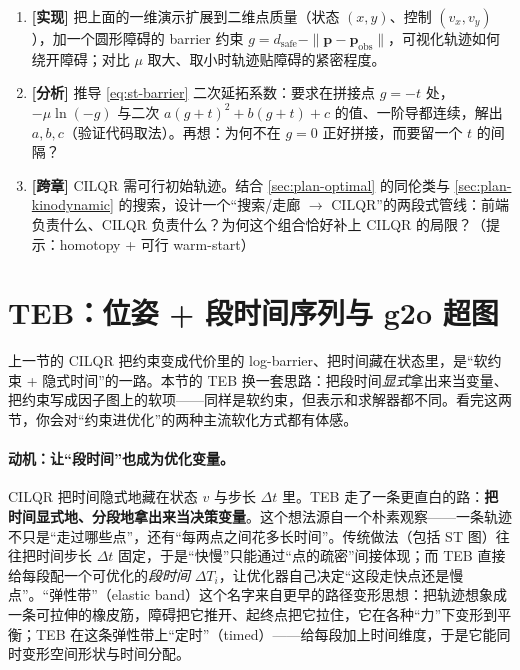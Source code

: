 \begin{practice}
\begin{enumerate}
  \item \textbf{[实现]} 把上面的一维演示扩展到二维点质量（状态 $(x,y)$、控制 $(v_x,v_y)$），加一个圆形障碍的 barrier 约束 $g=d_{\text{safe}}-\|\mathbf p-\mathbf p_{\text{obs}}\|$，可视化轨迹如何绕开障碍；对比 $\mu$ 取大、取小时轨迹贴障碍的紧密程度。
  \item \textbf{[分析]} 推导 \cref{eq:st-barrier} 二次延拓系数：要求在拼接点 $g=-t$ 处，$-\mu\ln(-g)$ 与二次 $a(g+t)^2+b(g+t)+c$ 的值、一阶导都连续，解出 $a,b,c$（验证代码取法）。再想：为何不在 $g=0$ 正好拼接，而要留一个 $t$ 的间隔？
  \item \textbf{[跨章]} CILQR 需可行初始轨迹。结合 \cref{sec:plan-optimal} 的同伦类与 \cref{sec:plan-kinodynamic} 的搜索，设计一个“搜索/走廊 $\to$ CILQR”的两段式管线：前端负责什么、CILQR 负责什么？为何这个组合恰好补上 CILQR 的局限？（提示：homotopy + 可行 warm-start）
\end{enumerate}
\end{practice}

\section{TEB：位姿 + 段时间序列与 g2o 超图}
\label{sec:st-teb}

\begin{note}
上一节的 CILQR 把约束变成代价里的 log-barrier、把时间藏在状态里，是“软约束 + 隐式时间”的一路。本节的 TEB 换一套思路：把段时间\emph{显式}拿出来当变量、把约束写成因子图上的软项——同样是软约束，但表示和求解器都不同。看完这两节，你会对“约束进优化”的两种主流软化方式都有体感。
\end{note}

\paragraph{动机：让“段时间”也成为优化变量。}
CILQR 把时间隐式地藏在状态 $v$ 与步长 $\Delta t$ 里。TEB 走了一条更直白的路：\textbf{把时间显式地、分段地拿出来当决策变量}。这个想法源自一个朴素观察——一条轨迹不只是“走过哪些点”，还有“每两点之间花多长时间”。传统做法（包括 ST 图）往往把时间步长 $\Delta t$ 固定，于是“快慢”只能通过“点的疏密”间接体现；而 TEB 直接给每段配一个可优化的\emph{段时间} $\Delta T_i$，让优化器自己决定“这段走快点还是慢点”。“弹性带”（elastic band）这个名字来自更早的路径变形思想：把轨迹想象成一条可拉伸的橡皮筋，障碍把它推开、起终点把它拉住，它在各种“力”下变形到平衡；TEB 在这条弹性带上“定时”（timed）——给每段加上时间维度，于是它能同时变形空间形状与时间分配\cite{rosmann2017teb}。

